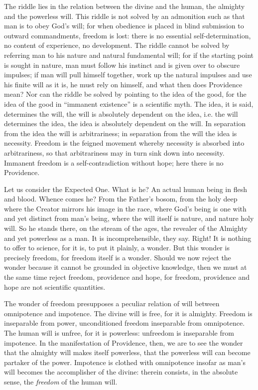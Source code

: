 \documentclass[12pt,a4paper,openany]{book}
\newcommand{\opage}[1]{\marginnote{\footnotesize\textit{[#1]}}}
\begin{document}
The riddle lies in the relation between the divine and the human, the almighty and the powerless will. This riddle is
not solved by an admonition such as that man is to obey God's will; for when obedience is placed in blind submission to
outward commandments, freedom is lost: there is no essential self-determination, no content of experience, no
development. The riddle cannot be solved by referring man to his nature and natural fundamental will; for if the
starting point is sought in nature, man must follow his instinct and is given over to obscure impulses; if man will
pull himself together, work up the natural impulses and use his finite will as it is, he must rely on himself, and
what then does Providence mean? Nor can the riddle be solved by pointing to the idea of the good, for the idea of the
good in ``immanent existence'' is a scientific myth. The idea, it is said, determines the will, the will is absolutely
dependent on the idea, i.e. the will determines the idea, the idea is absolutely dependent on the will. In separation
from the idea the will is arbitrariness; in separation from the will the idea is necessity. Freedom is the feigned
movement whereby necessity is absorbed into arbitrariness, so that arbitrariness may in turn sink down into necessity.
Immanent freedom is a self-contradiction without hope; here there is no Providence.

Let us consider the Expected One. What is he? An actual human being in flesh and blood. Whence comes
\setcounter{footnote}{0}%
\opage{64}he? From the Father's bosom, from the holy deep where the Creator mirrors his image in the race, where God's
being is one with and yet distinct from man's being, where the will itself is nature, and nature holy will. So he
stands there, on the stream of the ages, the revealer of the Almighty and yet powerless as a man. It is
incomprehensible, they say. Right! It is nothing to offer to science, for it is, to put it plainly, a wonder. But this
wonder is precisely freedom, for freedom itself is a wonder. Should we now reject the wonder because it cannot be
grounded in objective knowledge, then we must at the same time reject freedom, providence and hope, for freedom,
providence and hope are not scientific quantities.

The wonder of freedom presupposes a peculiar relation of will between omnipotence and impotence. The divine will is
free, for it is almighty. Freedom is inseparable from power, unconditioned freedom inseparable from omnipotence. The
human will is unfree, for it is powerless: unfreedom is inseparable from impotence. In the manifestation of Providence,
then, we are to see the wonder that the almighty will makes itself powerless, that the powerless will can become
partaker of the power. Impotence is clothed with omnipotence insofar as man's will becomes the accomplisher of the
divine: therein consists, in the absolute sense, the \emph{freedom} of the human will.
\end{document}
